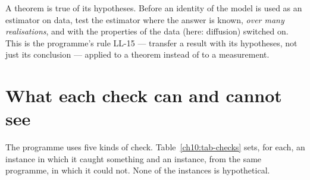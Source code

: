 \begin{keybox}
A theorem is true of its hypotheses. Before an identity of the model is used as an estimator on data, test the estimator where the answer is known,
\emph{over many realisations}, and with the properties of the data (here: diffusion) switched on. This is the programme's rule LL-15 --- transfer a
result with its hypotheses, not just its conclusion --- applied to a theorem instead of to a measurement.
\end{keybox}

\section{What each check can and cannot see}\label{ch10:sec-checks}

The programme uses five kinds of check. Table~\ref{ch10:tab-checks} sets, for each, an instance in which it caught something and an instance, from
the same programme, in which it could not. None of the instances is hypothetical.

